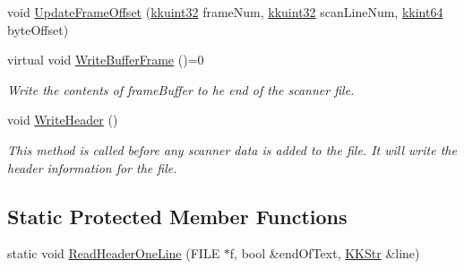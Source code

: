 \begin{DoxyCompactItemize}
void \hyperlink{class_k_k_l_s_c_1_1_scanner_file_a85bda4dad1f405ca13b21c53d91bc56f}{Update\+Frame\+Offset} (\hyperlink{namespace_k_k_b_af8d832f05c54994a1cce25bd5743e19a}{kkuint32} frame\+Num, \hyperlink{namespace_k_k_b_af8d832f05c54994a1cce25bd5743e19a}{kkuint32} scan\+Line\+Num, \hyperlink{namespace_k_k_b_aa3486b1c5ea9162b3b020c69f72826eb}{kkint64} byte\+Offset)
\item 
virtual void \hyperlink{class_k_k_l_s_c_1_1_scanner_file_a0dd1758522d374f14fec469099402962}{Write\+Buffer\+Frame} ()=0
\begin{DoxyCompactList}\small\item\em Write the contents of \textquotesingle{}frame\+Buffer\textquotesingle{} to he end of the scanner file. \end{DoxyCompactList}\item 
void \hyperlink{class_k_k_l_s_c_1_1_scanner_file_a7fa57a830e90de0820c15d2a2abef6ab}{Write\+Header} ()
\begin{DoxyCompactList}\small\item\em This method is called before any scanner data is added to the file. It will write the header information for the file. \end{DoxyCompactList}\end{DoxyCompactItemize}
\subsection*{Static Protected Member Functions}
\begin{DoxyCompactItemize}
\item 
static void \hyperlink{class_k_k_l_s_c_1_1_scanner_file_a5372ed9b850582b7576f38f8ca79d51c}{Read\+Header\+One\+Line} (F\+I\+LE $\ast$f, bool \&end\+Of\+Text, \hyperlink{class_k_k_b_1_1_k_k_str}{K\+K\+Str} \&line)
\end{DoxyCompactItemize}
